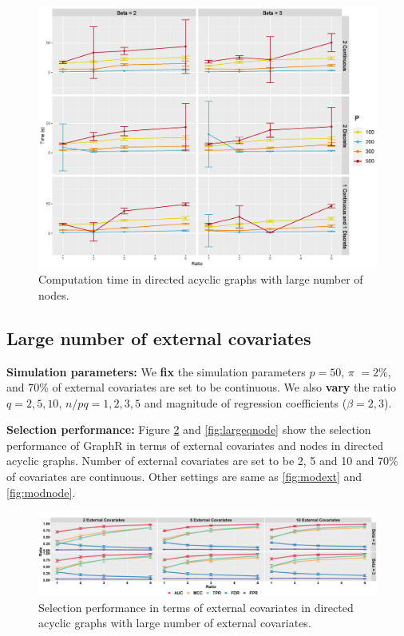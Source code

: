 \documentclass[
]{book}
\begin{document}
\begin{figure}

{\centering \includegraphics[width=1\linewidth]{images/highp_time} 

}

\caption{Computation time in directed acyclic graphs with large number of nodes.}\label{fig:highptime}
\end{figure}

\hypertarget{largeq}{%
\subsection{Large number of external covariates}\label{largeq}}

\textbf{Simulation parameters:} We \textbf{fix} the simulation parameters \(p = 50\), \(\pi\) \(= 2\%\), and 70\% of external covariates are set to be continuous. We also \textbf{vary} the ratio \(q = 2,5,10\), \(n/pq = 1,2,3,5\) and magnitude of regression coefficients (\(\beta=2,3\)).

\textbf{Selection performance: }
Figure \ref{fig:largeqext} and \ref{fig:largeqnode} show the selection performance of GraphR in terms of external covariates and nodes in directed acyclic graphs. Number of external covariates are set to be 2, 5 and 10 and 70\% of covariates are continuous. Other settings are same as \ref{fig:modext} and \ref{fig:modnode}.

\begin{figure}

{\centering \includegraphics[width=1\linewidth]{images/highq_ext} 

}

\caption{Selection performance in terms of external covariates in directed acyclic graphs with large number of external covariates.}\label{fig:largeqext}
\end{figure}
\end{document}
